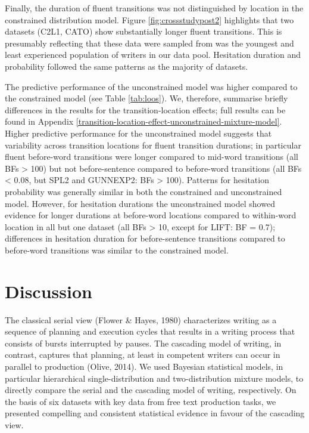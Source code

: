 \documentclass[
  man,floatsintext]{apa7}
\begin{document}
Finally, the duration of fluent transitions was not distinguished by location in the constrained distribution model. Figure \ref{fig:crossstudypost2} highlights that two datasets (C2L1, CATO) show substantially longer fluent transitions. This is presumably reflecting that these data were sampled from was the youngest and least experienced population of writers in our data pool. Hesitation duration and probability followed the same patterns as the majority of datasets.

The predictive performance of the unconstrained model was higher compared to the constrained model (see Table \ref{tab:loos}). We, therefore, summarise briefly differences in the results for the transition-location effects; full results can be found in Appendix \ref{transition-location-effect-unconstrained-mixture-model}. Higher predictive performance for the unconstrained model suggests that variability across transition locations for fluent transition durations; in particular fluent before-word transitions were longer compared to mid-word transitions (all BFs \textgreater{} 100) but not before-sentence compared to before-word transitions (all BFs \textless{} 0.08, but SPL2 and GUNNEXP2: BFs \textgreater{} 100). Patterns for hesitation probability was generally similar in both the constrained and unconstrained model. However, for hesitation durations the unconstrained model showed evidence for longer durations at before-word locations compared to within-word location in all but one dataset (all BFs \textgreater{} 10, except for LIFT: BF = 0.7); differences in hesitation duration for before-sentence transitions compared to before-word transitions was similar to the constrained model.

\hypertarget{discussion}{%
\section{Discussion}\label{discussion}}

The classical serial view (Flower \& Hayes, 1980) characterizes writing as a sequence of planning and execution cycles that results in a writing process that consists of bursts interrupted by pauses. The cascading model of writing, in contrast, captures that planning, at least in competent writers can occur in parallel to production (Olive, 2014). We used Bayesian statistical models, in particular hierarchical single-distribution and two-distribution mixture models, to directly compare the serial and the cascading model of writing, respectively. On the basis of six datasets with key data from free text production tasks, we presented compelling and consistent statistical evidence in favour of the cascading view.
\end{document}
